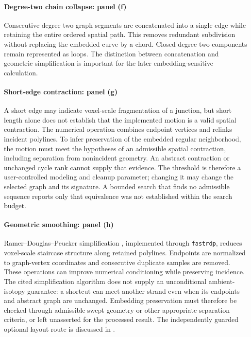 \documentclass[10pt,twocolumn]{article}
\begin{document}
\paragraph{Degree-two chain collapse: panel (f)}
Consecutive degree-two graph segments are concatenated into a single edge while retaining the entire ordered spatial path. This removes redundant subdivision without replacing the embedded curve by a chord. Closed degree-two components remain represented as loops. The distinction between concatenation and geometric simplification is important for the later embedding-sensitive calculation.

\paragraph{Short-edge contraction: panel (g)}
A short edge may indicate voxel-scale fragmentation of a junction, but short length alone does not establish that the implemented motion is a valid spatial contraction. The numerical operation combines endpoint vertices and relinks incident polylines. To infer preservation of the embedded regular neighborhood, the motion must meet the hypotheses of an admissible spatial contraction, including separation from nonincident geometry. An abstract contraction or unchanged cycle rank cannot supply that evidence. The threshold is therefore a user-controlled modeling and cleanup parameter; changing it may change the selected graph and its signature. A bounded search that finds no admissible sequence reports only that equivalence was not established within the search budget.

\paragraph{Geometric smoothing: panel (h)}
Ramer--Douglas--Peucker simplification \cite{kg_ramer1972,kg_douglas1973}, implemented through \texttt{fastrdp}, reduces voxel-scale staircase structure along retained polylines. Endpoints are normalized to graph-vertex coordinates and consecutive duplicate samples are removed. These operations can improve numerical conditioning while preserving incidence. The cited simplification algorithm does not supply an unconditional ambient-isotopy guarantee: a shortcut can meet another strand even when its endpoints and abstract graph are unchanged. Embedding preservation must therefore be checked through admissible swept geometry or other appropriate separation criteria, or left unasserted for the processed result. The independently guarded optional layout route is discussed in .
\end{document}
